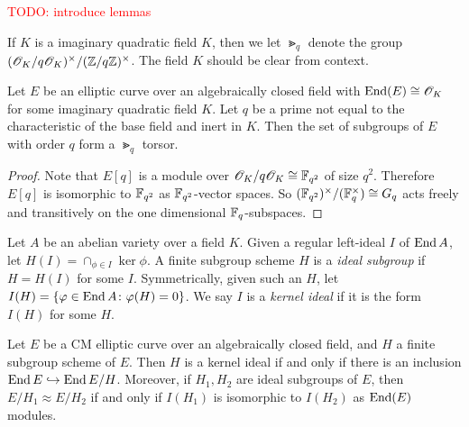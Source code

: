 \documentclass{amsart}
\begin{document}
\textcolor{red}{TODO: introduce lemmas}

\begin{definition}
  If $K$ is a imaginary quadratic field $K$, then we let $\Gt_q$ denote the group $(\mathscr{O}_K/q\mathscr{O}_K)^\times/(\mathbb{Z}/q\mathbb{Z})^\times$. The field $K$ should be clear from context.
\end{definition}

\begin{lemma}\label{lem:c-torsor}
  Let $E$ be an elliptic curve over an algebraically closed field with $\operatorname{End}(E) \cong \mathscr{O}_K$ for some imaginary quadratic field $K$. Let $q$ be a prime not equal to the characteristic of the base field and inert in $K$. Then the set of subgroups of $E$ with order $q$ form a $\Gt_q$ torsor.
\end{lemma}
\begin{proof}
  Note that $E[q]$ is a module over $\mathscr{O}_K/q\mathscr{O}_K \cong \mathbb{F}_{q^2}$  of size $q^2$. Therefore $E[q]$ is isomorphic to $\mathbb{F}_{q^2}$ as $\mathbb{F}_{q^2}$-vector spaces. So $(\mathbb{F}_{q^2})^\times/(\mathbb{F}_q^\times) \cong G_q$ acts freely and transitively on the one dimensional $\mathbb{F}_q$-subspaces.
\end{proof}

\begin{definition}\label{def:ker-idl}
  Let $A$ be an abelian variety over a field $K$. Given a regular left-ideal $I$ of $\operatorname{End} A$, let $H(I) = \cap_{\phi \in I}\ker \phi$. A finite subgroup scheme $H$ is a \emph{ideal subgroup} if $H = H(I)$ for some $I$. Symmetrically, given such an $H$, let $I(H) = \{\varphi \in \operatorname{End} A \colon \varphi(H) = 0\}$. We say $I$ is a \emph{kernel ideal} if it is the form $I(H)$ for some $H$.
\end{definition}

\begin{theorem}\label{thm:kani-20b}
  Let $E$ be a CM elliptic curve over an algebraically closed field, and $H$ a finite subgroup scheme of $E$. Then $H$ is a kernel ideal if and only if there is an inclusion $\operatorname{End} E \hookrightarrow \operatorname{End} E/H$. Moreover, if $H_1,H_2$ are ideal subgroups of $E$, then $E/H_1 \approx E/H_2$ if and only if $I(H_1)$ is isomorphic to $I(H_2)$ as $\operatorname{End}(E)$ modules.
\end{theorem}
\end{document}
